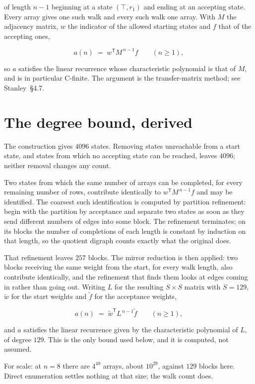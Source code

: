 \documentclass[11pt]{article}
\theoremstyle{definition}
\begin{document}
of length $n-1$ beginning at a state $(\top,r_1)$ and ending at an accepting state. Every array gives one such walk and every such walk one array. With $M$ the adjacency matrix, $w$ the indicator of the allowed starting states and $f$ that of the accepting ones,

\[a(n) \;=\; w^{\mathsf T} M^{\,n-1} f \qquad (n \ge 1),\]

so $a$ satisfies the linear recurrence whose characteristic polynomial is that of $M$, and is in particular C-finite. The argument is the transfer-matrix method; see Stanley~\S4.7.

\section{The degree bound, derived}

The construction gives $4096$ states. Removing states unreachable from a start state, and states from which no accepting state can be reached, leaves $4096$; neither removal changes any count.

Two states from which the same number of arrays can be completed, for every remaining number of rows, contribute identically to $w^{\mathsf T}M^{\,n-1}f$ and may be identified. The coarsest such identification is computed by partition refinement: begin with the partition by acceptance and separate two states as soon as they send different numbers of edges into some block. The refinement terminates; on its blocks the number of completions of each length is constant by induction on that length, so the quotient digraph counts exactly what the original does.

That refinement leaves $257$ blocks. The mirror reduction is then applied: two blocks receiving the same weight from the start, for every walk length, also contribute identically, and the refinement that finds them looks at edges coming in rather than going out. Writing $L$ for the resulting $S \times S$ matrix with $S = 129$, $\tilde w$ for the start weights and $\tilde f$ for the acceptance weights,

\[a(n) \;=\; \tilde w^{\mathsf T} L^{\,n-1} \tilde f \qquad (n \ge 1),\]

and $a$ satisfies the linear recurrence given by the characteristic polynomial of $L$, of degree $129$. This is the only bound used below, and it is computed, not assumed.

For scale: at $n = 8$ there are $4^{48}$ arrays, about $10^{29}$, against $129$ blocks here. Direct enumeration settles nothing at that size; the walk count does.
\end{document}
